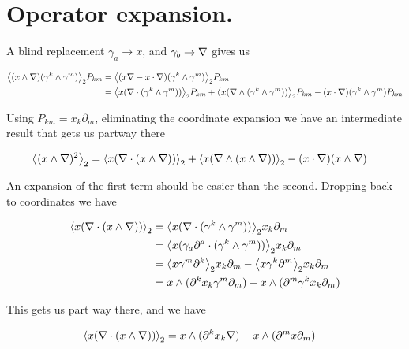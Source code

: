 \section{Operator expansion.}

A blind replacement $\gamma_a \rightarrow x$, and $\gamma_b \rightarrow \nabla$ gives us

\begin{align*}
{\left\langle{{ (x \wedge \nabla) (\gamma^k \wedge \gamma^m) }}\right\rangle}_{2} P_{km} 
&= 
{\left\langle{{ (x \nabla- x \cdot \nabla) (\gamma^k \wedge \gamma^m) }}\right\rangle}_{2} P_{km} \\
&= 
{\left\langle{{ x (\nabla\cdot (\gamma^k \wedge \gamma^m)) }}\right\rangle}_{2} P_{km} 
+ {\left\langle{{ x (\nabla\wedge (\gamma^k \wedge \gamma^m)) }}\right\rangle}_{2} P_{km} 
- (x \cdot \nabla) (\gamma^k \wedge \gamma^m) P_{km} \\
\end{align*}

Using $P_{km} = x_k \partial_m$, eliminating the coordinate expansion we have an intermediate result that gets us partway there

\begin{align}\label{eqn:bivectorSelect:goo2}
{\left\langle{{ (x \wedge \nabla)^2 }}\right\rangle}_{2}
&=
{\left\langle{{ x (\nabla\cdot (x \wedge \nabla)) }}\right\rangle}_{2} 
+ {\left\langle{{ x (\nabla\wedge (x \wedge \nabla)) }}\right\rangle}_{2} 
- (x \cdot \nabla) (x \wedge \nabla) 
\end{align}

An expansion of the first term should be easier than the second.  Dropping back to coordinates we have

\begin{align*}
{\left\langle{{ x (\nabla\cdot (x \wedge \nabla)) }}\right\rangle}_{2} 
&=
{\left\langle{{ x (\nabla\cdot (\gamma^k \wedge \gamma^m)) }}\right\rangle}_{2} x_k \partial_m \\
&=
{\left\langle{{ x (\gamma_a \partial^a \cdot (\gamma^k \wedge \gamma^m)) }}\right\rangle}_{2} x_k \partial_m \\
&=
{\left\langle{{ x \gamma^m \partial^k }}\right\rangle}_{2} x_k \partial_m 
-{\left\langle{{ x \gamma^k \partial^m }}\right\rangle}_{2} x_k \partial_m  \\
&=
x \wedge (\partial^k x_k \gamma^m \partial_m )
- x \wedge (\partial^m \gamma^k x_k \partial_m ) \\
\end{align*}

This gets us part way there, and we have

\begin{align}\label{eqn:bivectorSelect:goo3}
{\left\langle{{ x (\nabla\cdot (x \wedge \nabla)) }}\right\rangle}_{2} &= x \wedge (\partial^k x_k \nabla ) - x \wedge (\partial^m x \partial_m ) 
\end{align}

